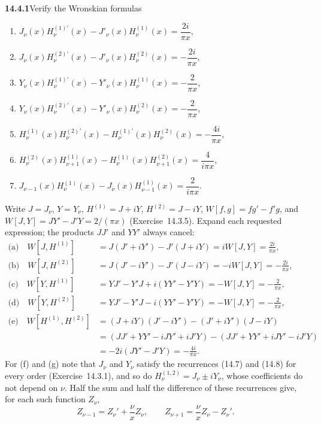 \par\bigskip
\noindent\textbf{14.4.1}\quad Verify the Wronskian formulas
\begin{enumerate}
\item[(a)] $J_{\nu}(x)H_{\nu}^{(1)\prime}(x)-J'_{\nu}(x)H_{\nu}^{(1)}(x)
=\dfrac{2i}{\pi x}$,
\item[(b)] $J_{\nu}(x)H_{\nu}^{(2)\prime}(x)-J'_{\nu}(x)H_{\nu}^{(2)}(x)
=-\dfrac{2i}{\pi x}$,
\item[(c)] $Y_{\nu}(x)H_{\nu}^{(1)\prime}(x)-Y'_{\nu}(x)H_{\nu}^{(1)}(x)
=-\dfrac{2}{\pi x}$,
\item[(d)] $Y_{\nu}(x)H_{\nu}^{(2)\prime}(x)-Y'_{\nu}(x)H_{\nu}^{(2)}(x)
=-\dfrac{2}{\pi x}$,
\item[(e)] $H_{\nu}^{(1)}(x)H_{\nu}^{(2)\prime}(x)
-H_{\nu}^{(1)\prime}(x)H_{\nu}^{(2)}(x)=-\dfrac{4i}{\pi x}$,
\item[(f)] $H_{\nu}^{(2)}(x)H_{\nu+1}^{(1)}(x)
-H_{\nu}^{(1)}(x)H_{\nu+1}^{(2)}(x)=\dfrac{4}{i\pi x}$,
\item[(g)] $J_{\nu-1}(x)H_{\nu}^{(1)}(x)-J_{\nu}(x)H_{\nu-1}^{(1)}(x)
=\dfrac{2}{i\pi x}$.
\end{enumerate}
\solution
Write $J=J_\nu$, $Y=Y_\nu$,
$H^{(1)}=J+iY$, $H^{(2)}=J-iY$, $W[f,g]=fg'-f'g$, and
$W[J,Y]=JY'-J'Y=2/(\pi x)$ (Exercise~14.3.5). Expand each
requested expression; the products $JJ'$ and $YY'$ always cancel:
\begin{align*}
\text{(a)}\quad W[J,H^{(1)}]
&=J(J'+iY')-J'(J+iY)=iW[J,Y]=\frac{2i}{\pi x},\\
\text{(b)}\quad W[J,H^{(2)}]
&=J(J'-iY')-J'(J-iY)=-iW[J,Y]=-\frac{2i}{\pi x},\\
\text{(c)}\quad W[Y,H^{(1)}]
&=YJ'-Y'J+i(YY'-Y'Y)=-W[J,Y]=-\frac2{\pi x},\\
\text{(d)}\quad W[Y,H^{(2)}]
&=YJ'-Y'J-i(YY'-Y'Y)=-W[J,Y]=-\frac2{\pi x},\\
\text{(e)}\quad W[H^{(1)},H^{(2)}]
&=(J+iY)(J'-iY')-(J'+iY')(J-iY)\\
&=(JJ'+YY'-iJY'+iJ'Y)-(JJ'+YY'+iJY'-iJ'Y)\\
&=-2i(JY'-J'Y)=-\frac{4i}{\pi x}.
\end{align*}
For (f) and (g) note that $J_\nu$ and $Y_\nu$ satisfy the
recurrences (14.7) and (14.8) for every order (Exercise~14.3.1),
and so do
$H_\nu^{(1,2)}=J_\nu\pm iY_\nu$, whose coefficients do not depend
on $\nu$. Half the sum and half the difference of these
recurrences give, for each such function $Z_\nu$,
\[
Z_{\nu-1}=Z_\nu'+\frac\nu xZ_\nu,\qquad
Z_{\nu+1}=\frac\nu xZ_\nu-Z_\nu'.
\]

